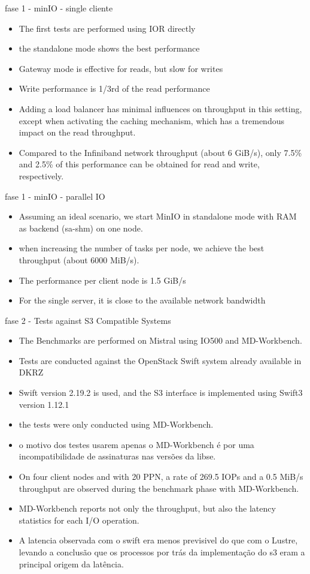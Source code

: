 \documentclass{beamer}
\begin{document}
\begin{frame}{fase 1 - minIO - single cliente}
	\begin{itemize}
		\item The first tests are performed using IOR directly
		\item the standalone mode shows the best performance
		\item Gateway mode is effective for reads,
		but slow for writes
		\item Write performance is 1/3rd of the read performance
		\item Adding a load balancer has minimal
		influences on throughput in this setting, except when activating the caching mechanism,
		which has a tremendous impact on the read throughput.
		\item Compared to the
		Infiniband network throughput (about 6 GiB/s), only 7.5\% and 2.5\% of this performance
		can be obtained for read and write, respectively.
	\end{itemize}
\end{frame}
\begin{frame}{fase 1 - minIO - parallel IO}
	\begin{itemize}
		\item Assuming an ideal scenario, we
		start MinIO in standalone mode with RAM as backend (sa-shm) on one node.
		\item when increasing the number of tasks per node, we achieve the best
		throughput (about 6000 MiB/s).
		\item The performance per client node is 1.5 GiB/s
		\item For the
		single server, it is close to the available network bandwidth
	\end{itemize}
\end{frame}
\begin{frame}{fase 2 - Tests against S3 Compatible Systems}
	\begin{itemize}
		\item The Benchmarks are performed on Mistral using IO500 and MD-Workbench.
		\item Tests are conducted against the OpenStack Swift system already available in DKRZ
		\item Swift version 2.19.2 is used, and the S3 interface is implemented using Swift3 version 1.12.1
		\item the tests were only conducted using MD-Workbench.
		\item o motivo dos testes usarem apenas o MD-Workbench é por uma incompatibilidade de assinaturas nas versões da libse.
		\item On
		four client nodes and with 20 PPN, a rate of 269.5 IOPs and a 0.5 MiB/s throughput are
		observed during the benchmark phase with MD-Workbench.
		\item MD-Workbench reports not only the throughput, but also the latency statistics for
		each I/O operation.
		\item A latencia observada com o swift era menos previsivel do que com o Lustre, levando a conclusão que os processos por trás da implementação do s3 eram a principal origem da latência.
	\end{itemize}
\end{frame}
\end{document}
